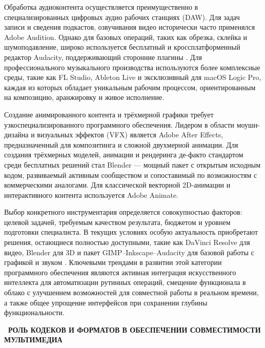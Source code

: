 \documentclass{SibFU-docs}
\begin{document}

Обработка аудиоконтента осуществляется преимущественно в специализированных цифровых аудио рабочих станциях (DAW). Для задач записи и сведения подкастов, озвучивания видео исторически часто применялся Adobe Audition. Однако для базовых операций, таких как обрезка, склейка и шумоподавление, широко используется бесплатный и кроссплатформенный редактор Audacity, поддерживающий сторонние плагины \cite{dtf}. Для профессионального музыкального производства используются более комплексные среды, такие как FL Studio, Ableton Live и эксклюзивный для macOS Logic Pro, каждая из которых обладает уникальным рабочим процессом, ориентированным на композицию, аранжировку и живое исполнение.


Создание анимированного контента и трёхмерной графики требует узкоспециализированного программного обеспечения. Лидером в области моушн-дизайна и визуальных эффектов (VFX) является Adobe After Effects, предназначенный для композитинга и сложной двухмерной анимации. Для создания трёхмерных моделей, анимации и рендеринга де-факто стандартом среди бесплатных решений стал Blender — мощный пакет с открытым исходным кодом, развиваемый активным сообществом и сопоставимый по возможностям с коммерческими аналогами. Для классической векторной 2D-анимации и интерактивного контента используется Adobe Animate.


Выбор конкретного инструментария определяется совокупностью факторов: целевой задачей, требуемым качеством результата, бюджетом и уровнем подготовки специалиста. В текущих условиях особую актуальность приобретают решения, остающиеся полностью доступными, такие как DaVinci Resolve для видео, Blender для 3D и пакет GIMP–Inkscape–Audacity для базовой работы с графикой и звуком \cite{skypro, lifehacker}. Ключевыми трендами в развитии этой категории программного обеспечения являются активная интеграция искусственного интеллекта для автоматизации рутинных операций, смещение функционала в облако с улучшением возможностей для совместной работы в реальном времени, а также общее упрощение интерфейсов при сохранении глубины функциональности.

\newpage
{}
\begin{center}\textbf{\thesection\ РОЛЬ КОДЕКОВ И ФОРМАТОВ В ОБЕСПЕЧЕНИИ СОВМЕСТИМОСТИ МУЛЬТИМЕДИА}\end{center}
\vspace*{-1.5em}
\end{document}
